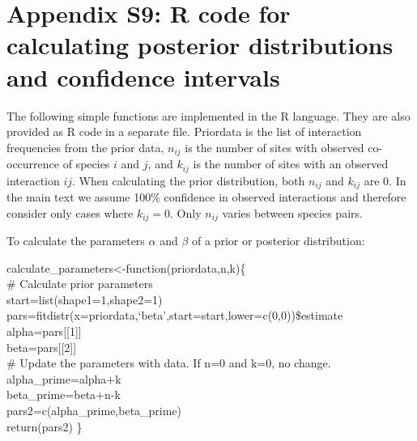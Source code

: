 \documentclass[12pt]{article}
\begin{document}



\clearpage

\section*{Appendix S9: R code for calculating posterior distributions and confidence intervals}

  The following simple functions are implemented in the R language. They are 
  also provided as R code in a separate file.
  Priordata is the list of interaction frequencies from the prior 
  data, $n_{ij}$ is the number of sites with observed co-occurrence of 
  species $i$ and $j$, and $k_{ij}$ is the number of sites with an 
  observed interaction $ij$. When calculating the prior 
  distribution, both $n_{ij}$ and $k_{ij}$ are 0. In the main text we assume 100\%
  confidence in observed interactions and therefore consider only 
  cases where $k_{ij}=0$. Only $n_{ij}$ varies between species pairs.


  To calculate the parameters $\alpha$ and $\beta$ of a prior or 
  posterior distribution:

  \vspace{12pt}
  \begin{em}
  \noindent \hspace{2pt}calculate\_parameters\textless-function(priordata,n,k)\{\\
  \vspace{4pt}
    \# Calculate prior parameters\\
    start=list(shape1=1,shape2=1)\\
    pars=fitdistr(x=priordata,`beta',start=start,lower=c(0,0))\$estimate\\
    alpha=pars[[1]]\\
    beta=pars[[2]]\\
  \vspace{4pt}
    \# Update the parameters with data. If n=0 and k=0, no change.\\
    alpha\_prime=alpha+k\\
    beta\_prime=beta+n-k\\
    pars2=c(alpha\_prime,beta\_prime)\\
    return(pars2) \}
  \end{em}
  \vspace{12pt}
\end{document}
